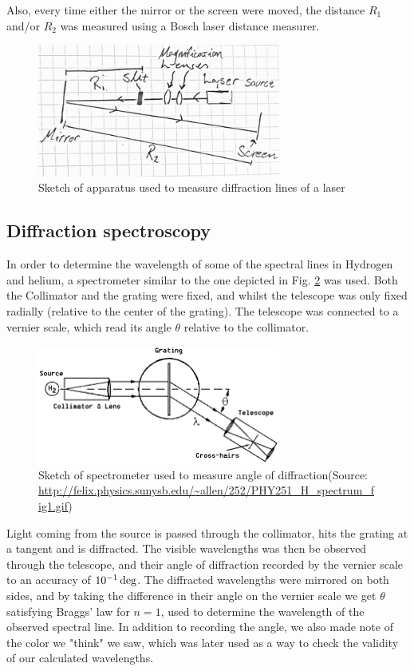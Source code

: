 \documentclass[11pt,a4paper]{article}
\begin{document}
      Also, every time either the mirror or the screen were moved, the distance $R_1$ and/or $R_2$ was measured using a Bosch laser distance measurer.

    \begin{figure}[H]
        \center
        \includegraphics[width=8cm]{scripts/figs/diff_diagram.png}
        \caption{Sketch of apparatus used to measure diffraction lines of a laser}
        \label{fig:laser}
    \end{figure}

    \subsection{Diffraction spectroscopy}

    In order to determine the wavelength of some of the spectral lines in Hydrogen and helium, a spectrometer similar to the one depicted in Fig. \ref{fig:spectrometer} was used. Both the Collimator and the grating were fixed, and whilst the telescope was only fixed radially (relative to the center of the grating). The telescope was connected to a vernier scale, which read its angle $\theta$ relative to the collimator.

    \begin{figure}[H]
        \center
        \includegraphics[width=8cm]{scripts/figs/PHY251_H_spectrum_fig1.png}
        \caption{Sketch of spectrometer used to measure angle of diffraction(Source: \url{http://felix.physics.sunysb.edu/~allen/252/PHY251_H_spectrum_fig1.gif})}
        \label{fig:spectrometer}
    \end{figure}

    Light coming from the source is passed through the collimator, hits the grating at a tangent and is diffracted. The visible wavelengths was then be observed through the telescope, and their angle of diffraction recorded by the vernier scale to an accuracy of $10^{-1}\,\textup{deg}$. The diffracted wavelengths were mirrored on both sides, and by taking the difference in their angle on the vernier scale we get $\theta$ satisfying Braggs' law for $n=1$, used to determine the wavelength of the observed spectral line. In addition to recording the angle, we also made note of the color we "think" we saw, which was later used as a way to check the validity of our calculated wavelengths.
\end{document}
